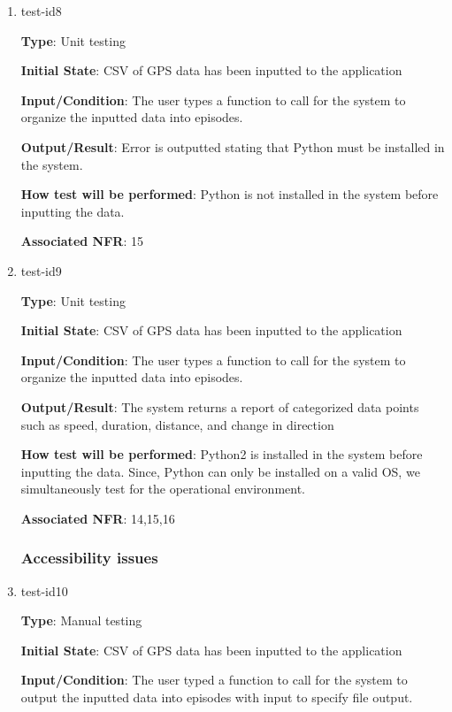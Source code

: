 \documentclass[12pt, titlepage]{article}
\begin{document}
\begin{enumerate}

\item{test-id8\\}

\textbf{Type}: Unit testing
					
\textbf{Initial State}: CSV of GPS data has been inputted to the application
					
\textbf{Input/Condition}: The user types a function to call for the system to organize the
inputted data into episodes. 
					
\textbf{Output/Result}: Error is outputted stating that Python must be installed in the system.
					
\textbf{How test will be performed}: Python is not installed in the system before inputting the data. 

\textbf{Associated NFR}: 15

\item{test-id9\\}

\textbf{Type}: Unit testing
					
\textbf{Initial State}: CSV of GPS data has been inputted to the application
					
\textbf{Input/Condition}: The user types a function to call for the system to organize the
inputted data into episodes. 
					
\textbf{Output/Result}: The system returns a report of categorized data points such
as speed, duration, distance, and change in direction
					
\textbf{How test will be performed}: Python2 is installed in the system before inputting the data. Since, Python can only be installed on a valid OS, we simultaneously test for the operational environment.

\textbf{Associated NFR}: 14,15,16

\subsubsection{Accessibility issues}

\item{test-id10\\}

\textbf{Type}: Manual testing
					
\textbf{Initial State}: CSV of GPS data has been inputted to the application
					
\textbf{Input/Condition}: The user typed a function to call for the system to output the
inputted data into episodes with input to specify file output. 
					

\end{enumerate}
\end{document}
